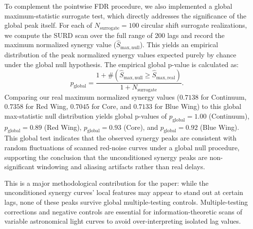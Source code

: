 \documentclass[fleqn,usenatbib]{mnras}
\begin{document}
To complement the pointwise FDR procedure, we also implemented a global maximum-statistic surrogate test, which directly addresses the significance of the global peak itself. For each of $N_{\mathrm{surrogate}} = 100$ circular shift surrogate realizations, we compute the SURD scan over the full range of 200 lags and record the maximum normalized synergy value ($\widehat{S}_{\mathrm{max, null}}$). This yields an empirical distribution of the peak normalized synergy values expected purely by chance under the global null hypothesis. The empirical global p-value is calculated as:
\begin{equation}
p_{\mathrm{global}} = \frac{1 + \#(\widehat{S}_{\mathrm{max, null}} \ge \widehat{S}_{\mathrm{max, real}})}{1 + N_{\mathrm{surrogate}}}.
\end{equation}
Comparing our real maximum normalized synergy values ($0.7138$ for Continuum, $0.7358$ for Red Wing, $0.7045$ for Core, and $0.7133$ for Blue Wing) to this global max-statistic null distribution yields global p-values of $p_{\mathrm{global}} = 1.00$ (Continuum), $p_{\mathrm{global}} = 0.89$ (Red Wing), $p_{\mathrm{global}} = 0.93$ (Core), and $p_{\mathrm{global}} = 0.92$ (Blue Wing). This global test indicates that the observed synergy peaks are consistent with random fluctuations of scanned red-noise curves under a global null procedure, supporting the conclusion that the unconditioned synergy peaks are non-significant windowing and aliasing artifacts rather than real delays.

This is a major methodological contribution for the paper: while the unconditioned synergy curves' local features may appear to stand out at certain lags, none of these peaks survive global multiple-testing controls. Multiple-testing corrections and negative controls are essential for information-theoretic scans of variable astronomical light curves to avoid over-interpreting isolated lag values.
\end{document}
